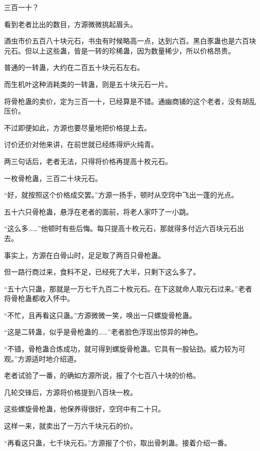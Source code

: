 
\begin{this_body}

三百一十？

看到老者比出的数目，方源微微挑起眉头。

酒虫市价五百八十块元石，书虫有时候略高一点，达到六百。黑白豕蛊也是六百块元石。但以上这些蛊，皆是一转的珍稀蛊，因为数量稀少，所以价格昂贵。

普通的一转蛊，大约在二百五十块元石左右。

而生机叶这种消耗类的一转蛊，则是五十块元石一片。

将骨枪蛊的卖价，定为三百一十，已经算是不错。通幽商铺的这个老者，没有胡乱压价。

不过即便如此，方源也要尽量地把价格提上去。

讨价还价对他来讲，在前世就已经练得炉火纯青。

两三句话后，老者无法，只得将价格再提高十枚元石。

一枚骨枪蛊，三百二十块元石。

“好，就按照这个价格成交罢。”方源一扬手，顿时从空窍中飞出一蓬的光点。

五十六只骨枪蛊，悬浮在老者的面前，将老人家吓了一小跳。

“这么多……”他顿时有些后悔。每只提高十枚元石，那就得多付近六百块元石出去。

事实上，方源在白骨山时，足足取了两百只骨枪蛊。

但一路行商过来，食料不足，已经死了大半，只剩下这么多了。

“五十六只蛊，那就是一万七千九百二十枚元石。在下这就命人取元石过来。”老者将骨枪蛊都收入怀中。

“不忙，且再看这只蛊。”方源微微一笑，唤出一只螺旋骨枪蛊。

“这是二转蛊，似乎是骨枪蛊的……”老者脸色浮现出惊异的神色。

“不错，骨枪蛊合炼成功，就可得到螺旋骨枪蛊。它具有一股钻劲。威力较为可观。”方源适时地介绍道。

老者试验了一番，的确如方源所说，报了个七百八十块的价格。

几轮交锋后，方源将价格提到八百块一枚。

这些螺旋骨枪蛊，他保养得很好，空窍中有二十只。

这样一来，就卖出了一万六千块元石的价。

“再看这只蛊，七千块元石。”方源报了个价，取出骨刺蛊。接着介绍一番。


\end{this_body}
